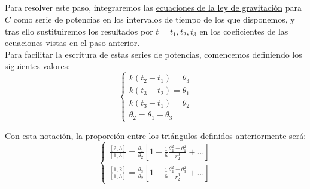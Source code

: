 \documentclass[11pt]{article}
\begin{document}
\subsection{}
Para resolver este paso, integraremos las \hyperref[eq:ley_gracitacion_C]{ecuaciones de la ley de gravitación} para $C$ como serie de potencias en los intervalos de tiempo de los que disponemos, y tras ello sustituiremos los resultados por $t=t_1,t_2,t_3$ en los coeficientes de las ecuaciones vistas en el paso anterior.\\

Para facilitar la escritura de estas series de potencias, comencemos definiendo los siguientes valores:
\[
\left\{
\begin{array}{l}
	k(t_2-t_1)=\theta_3\\
	k(t_3-t_2)=\theta_1\\
	k(t_3-t_1)=\theta_2\\
	\theta_2=\theta_1+\theta_3
\end{array}
\right.
\]

Con esta notación, la proporción entre los triángulos definidos anteriormente será:
\[
\left\{
\begin{array}{l}
	\frac{[2,3]}{[1,3]}=\frac{\theta_1}{\theta_2}[1+\frac{1}{6}\frac{\theta_2^2-\theta_1^2}{r_2^3}+...]\\
	\frac{[1,2]}{[1,3]}=\frac{\theta_3}{\theta_2}[1+\frac{1}{6}\frac{\theta_2^2-\theta_3^2}{r_2^3}+...]
\end{array}
\right.
\]\\
\end{document}
